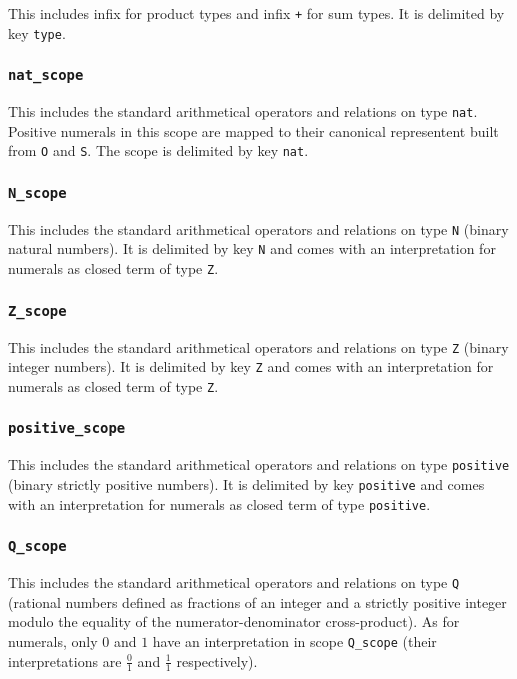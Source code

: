 This includes infix {\tt *} for product types and infix {\tt +} for
sum types. It is delimited by key {\tt type}.

\subsubsection{\tt nat\_scope}

This includes the standard arithmetical operators and relations on
type {\tt nat}. Positive numerals in this scope are mapped to their
canonical representent built from {\tt O} and {\tt S}. The scope is
delimited by key {\tt nat}.

\subsubsection{\tt N\_scope}

This includes the standard arithmetical operators and relations on
type {\tt N} (binary natural numbers). It is delimited by key {\tt N}
and comes with an interpretation for numerals as closed term of type {\tt Z}.

\subsubsection{\tt Z\_scope}

This includes the standard arithmetical operators and relations on
type {\tt Z} (binary integer numbers). It is delimited by key {\tt Z} 
and comes with an interpretation for numerals as closed term of type {\tt Z}.

\subsubsection{\tt positive\_scope}

This includes the standard arithmetical operators and relations on
type {\tt positive} (binary strictly positive numbers). It is
delimited by key {\tt positive} and comes with an interpretation for
numerals as closed term of type {\tt positive}.

\subsubsection{\tt Q\_scope}

This includes the standard arithmetical operators and relations on
type {\tt Q} (rational numbers defined as fractions of an integer and
a strictly positive integer modulo the equality of the
numerator-denominator cross-product). As for numerals, only $0$ and
$1$ have an interpretation in scope {\tt Q\_scope} (their
interpretations are $\frac{0}{1}$ and $\frac{1}{1}$ respectively).

